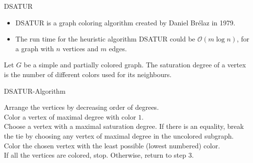 \documentclass{beamer}
\begin{document}
\begin{frame}{DSATUR}
\begin{itemize}

\item DSATUR is a graph coloring algorithm created by Daniel Br\'elaz in 1979. 
\pause
\item The run time for the heuristic algorithm DSATUR could be $\mathcal{O}(m \log n)$, for a graph with $n$ vertices and $m$ edges.
\end{itemize}
\pause
\begin{definition}
Let $G$ be a simple and partially colored graph. The \color{red} saturation degree \color{black} of a vertex is the number of different colors used for its neighbours.
\end{definition}
\pause
\begin{example}
\begin{center}
\end{center}
\end{example}

\end{frame}

\begin{frame}{DSATUR-Algorithm}

\begin{algorithm}[H]
\begin{algorithmic}[1]
\SetAlgoLined
\DontPrintSemicolon
  \caption{DSATUR (so called because it uses saturation degree)}
\pause
\STATE Arrange the vertices by decreasing order of degrees.\\
\pause
\STATE Color a vertex of maximal degree with color $1$.\\
\pause
\STATE Choose a vertex with a maximal saturation degree. If there is an 
  equality, break the tie by choosing any vertex of maximal degree in the uncolored
subgraph.\\
\pause
\STATE Color the chosen vertex with the least possible (lowest numbered)
color.\\
\pause
\STATE If all the vertices are colored, stop. Otherwise, return to step 3.\\
\end{algorithmic}
\end{algorithm}
\end{frame}
\end{document}
